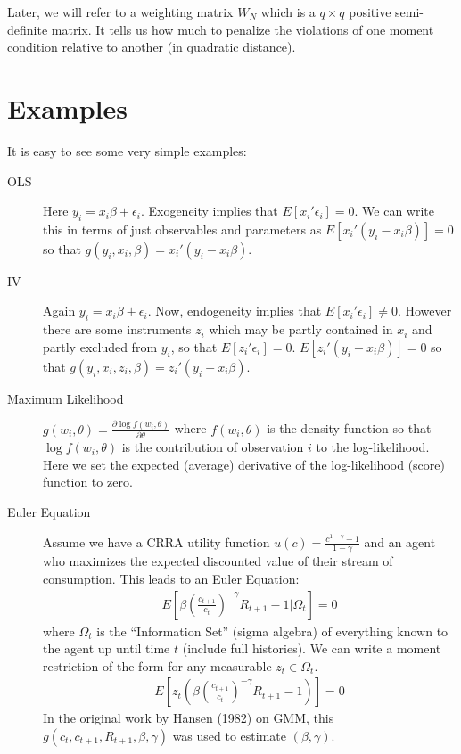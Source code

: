 \documentclass[a4paper]{article}
\begin{document}
\noindent Later, we will refer to a weighting matrix $W_N$ which is a $q \times q$ positive semi-definite matrix. It tells us how much to penalize the violations of one moment condition relative to another (in quadratic distance).


\section*{\normalsize Examples}
It is easy to see some very simple examples:
\begin{description} 
\item[OLS] Here $y_i = x_i \beta + \epsilon_i$. Exogeneity implies that $E[x_i' \epsilon_i]=0$. We can write this in terms of just observables and parameters as $E[x_i' (y_i - x_i \beta)]=0$ so that $g(y_i,x_i, \beta) = x_i' (y_i - x_i \beta)$.
\item[IV]  Again $y_i = x_i \beta + \epsilon_i$. Now, endogeneity implies that $E[x_i' \epsilon_i]\neq0$. However there are some instruments $z_i$ which may be partly contained in $x_i$ and partly excluded from $y_i$, so that $E[z_i' \epsilon_i]=0$. $E[z_i' (y_i - x_i \beta)]=0$ so that $g(y_i,x_i,z_i, \beta) = z_i' (y_i - x_i \beta)$.
\item[Maximum Likelihood] $g(w_i,\theta) =  \frac{\partial \log f(w_i,\theta)}{\partial \theta}$ where $f(w_i,\theta)$ is the density function so that $\log f(w_i,\theta)$ is the contribution of observation $i$ to the log-likelihood. Here we set the expected (average) derivative of the log-likelihood (score) function to zero.
\item[Euler Equation] Assume we have a CRRA utility function $u(c) = \frac{c^{1-\gamma} -1}{1-\gamma}$ and an agent who maximizes the expected discounted value of their stream of consumption. This leads to an Euler Equation:
\begin{eqnarray*}
E \left[\beta \left( \frac{c_{t+1}}{c_t} \right)^{-\gamma} R_{t+1} -1 | \Omega_t \right] =0
\end{eqnarray*}
where $\Omega_t$ is the ``Information Set'' (sigma algebra) of everything known to the agent up until time $t$ (include full histories). We can write a moment restriction of the form for any measurable $z_t \in \Omega_t$.
\begin{eqnarray*}
E \left[z_t \left(\beta  \left( \frac{c_{t+1}}{c_t} \right)^{-\gamma} R_{t+1} -1\right) \right] =0
\end{eqnarray*}
In the original work by Hansen (1982) on GMM, this $g(c_t,c_{t+1},R_{t+1},\beta,\gamma)$ was used to estimate $(\beta,\gamma)$.
\end{description}
\end{document}
